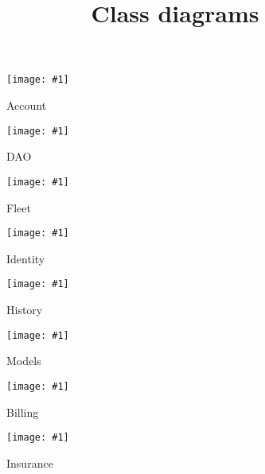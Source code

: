 \documentclass{article}
\newcommand{\diagram}[2]{
	\texttt{[image: \#1]}
	\caption{#2}
}
\newcommand{\vertdiagram}[2]{
	\begin{sidewaysfigure}
		\diagram{#1}{#2}
	\end{sidewaysfigure}
}
\begin{document}
	\title{Class diagrams}
	\date{}
	\maketitle
	\vertdiagram{ClassDiagramAccount}{Account}
	\vertdiagram{ClassDiagramDAO}{DAO}
	\vertdiagram{ClassDiagramFleet}{Fleet}
	\vertdiagram{ClassDiagramIdentity}{Identity}
	\vertdiagram{ClassDiagramHistory}{History}
	\vertdiagram{ClassDiagramModels}{Models}
	\vertdiagram{ClassDiagramBilling}{Billing}
	\vertdiagram{ClassDiagramInsurance}{Insurance}
\end{document}
